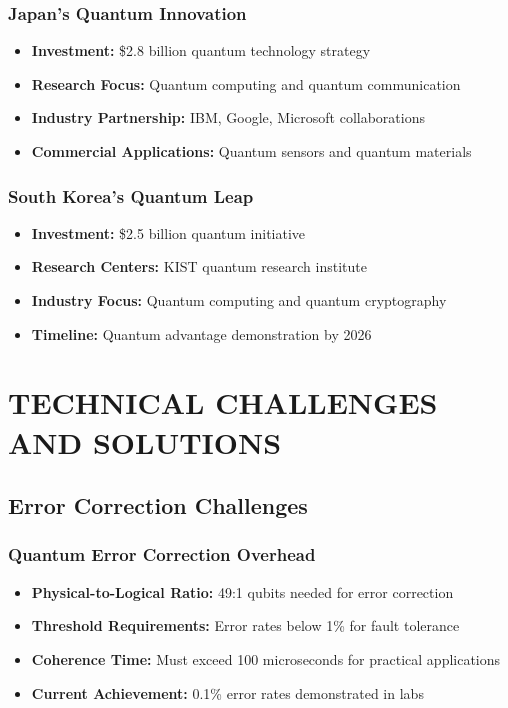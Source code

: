 \documentclass[12pt,a4paper]{article}
\begin{document}
\subsubsection{Japan's Quantum Innovation}
\begin{itemize}
    \item \textbf{Investment:} \$2.8 billion quantum technology strategy
    \item \textbf{Research Focus:} Quantum computing and quantum communication
    \item \textbf{Industry Partnership:} IBM, Google, Microsoft collaborations
    \item \textbf{Commercial Applications:} Quantum sensors and quantum materials
\end{itemize}

\subsubsection{South Korea's Quantum Leap}
\begin{itemize}
    \item \textbf{Investment:} \$2.5 billion quantum initiative
    \item \textbf{Research Centers:} KIST quantum research institute
    \item \textbf{Industry Focus:} Quantum computing and quantum cryptography
    \item \textbf{Timeline:} Quantum advantage demonstration by 2026
\end{itemize}

\section{TECHNICAL CHALLENGES AND SOLUTIONS}

\subsection{Error Correction Challenges}

\subsubsection{Quantum Error Correction Overhead}
\begin{itemize}
    \item \textbf{Physical-to-Logical Ratio:} 49:1 qubits needed for error correction
    \item \textbf{Threshold Requirements:} Error rates below 1\% for fault tolerance
    \item \textbf{Coherence Time:} Must exceed 100 microseconds for practical applications
    \item \textbf{Current Achievement:} 0.1\% error rates demonstrated in labs
\end{itemize}
\end{document}

